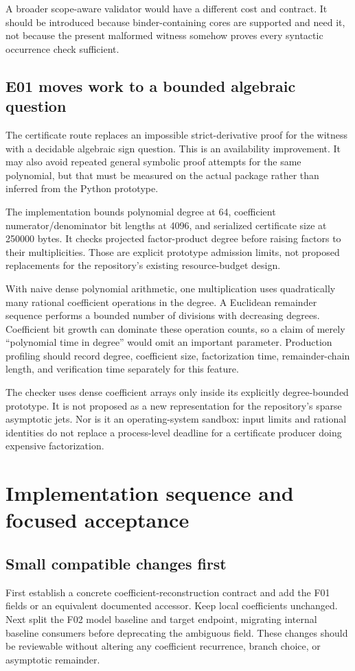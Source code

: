 \documentclass[11pt,letterpaper]{article}
\begin{document}
A broader scope-aware validator would have a different cost and contract. It should be introduced because binder-containing cores are supported and need it, not because the present malformed witness somehow proves every syntactic occurrence check sufficient.

\subsection{E01 moves work to a bounded algebraic question}
The certificate route replaces an impossible strict-derivative proof for the witness with a decidable algebraic sign question. This is an availability improvement. It may also avoid repeated general symbolic proof attempts for the same polynomial, but that must be measured on the actual package rather than inferred from the Python prototype.

The implementation bounds polynomial degree at 64, coefficient numerator/denominator bit lengths at 4096, and serialized certificate size at 250000 bytes. It checks projected factor-product degree before raising factors to their multiplicities. Those are explicit prototype admission limits, not proposed replacements for the repository's existing resource-budget design.

With naive dense polynomial arithmetic, one multiplication uses quadratically many rational coefficient operations in the degree. A Euclidean remainder sequence performs a bounded number of divisions with decreasing degrees. Coefficient bit growth can dominate these operation counts, so a claim of merely ``polynomial time in degree'' would omit an important parameter. Production profiling should record degree, coefficient size, factorization time, remainder-chain length, and verification time separately for this feature.

The checker uses dense coefficient arrays only inside its explicitly degree-bounded prototype. It is not proposed as a new representation for the repository's sparse asymptotic jets. Nor is it an operating-system sandbox: input limits and rational identities do not replace a process-level deadline for a certificate producer doing expensive factorization.

\section{Implementation sequence and focused acceptance}
\label{sec:acceptance}

\subsection{Small compatible changes first}
First establish a concrete coefficient-reconstruction contract and add the F01 fields or an equivalent documented accessor. Keep local coefficients unchanged. Next split the F02 model baseline and target endpoint, migrating internal baseline consumers before deprecating the ambiguous field. These changes should be reviewable without altering any coefficient recurrence, branch choice, or asymptotic remainder.
\end{document}
